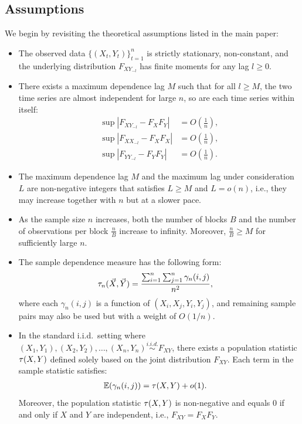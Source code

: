 \subsection{Assumptions}
We begin by revisiting the theoretical assumptions listed in the main paper:
\begin{itemize}
\item The observed data $\{(X_t, Y_t)\}_{t=1}^{n}$ is strictly stationary, non-constant, and the underlying distribution $F_{XY_{-l}}$ has finite moments for any lag $l \geq 0$. 
\item There exists a maximum dependence lag $M$ such that for all $l \geq M$, the two time series are almost independent for large $n$, so are each time series within itself:
    \begin{align*}
        \sup|F_{X Y_{-l}} - F_{X}F_{Y}| &= O(\frac{1}{n}) ,\\
        \sup|F_{X X_{-l}} - F_{X}F_{X}| &= O(\frac{1}{n}) ,\\
        \sup|F_{Y Y_{-l}} - F_{Y}F_{Y}| &= O(\frac{1}{n}) .
    \end{align*}
\item The maximum dependence lag $M$ and the maximum lag under consideration $L$ are non-negative integers that satisfies $L \geq M$ and $L=o(n)$, i.e., they may increase together with $n$ but at a slower pace.
\item As the sample size $n$ increases, both the number of blocks $B$ and the number of observations per block $\frac{n}{B}$ increase to infinity. Moreover, $\frac{n}{B} \geq M$ for sufficiently large $n$.
\item The sample dependence measure has the following form:
\begin{align*}
        \tau_{n}(\vec{X},\vec{Y}) &=\frac{\sum_{i=1}^{n}\sum_{j=1}^{n} \gamma_{n}(i,j)}{n^2},
    \end{align*} 
    where each $\gamma_{n}(i,j)$ is a function of $(X_i,X_j, Y_i,Y_j)$, and remaining sample pairs may also be used but with a weight of $O(1/n)$.
\item In the standard i.i.d.~setting where $(X_1,Y_1), (X_2, Y_2),\ldots, (X_n, Y_n) \stackrel{i.i.d.}{\sim} F_{XY}$, there exists a population statistic $\tau(X, Y)$ defined solely based on the joint distribution $F_{XY}$. Each term in the sample statistic satisfies:
\begin{align*}
        \mathbb{E}(\gamma_{n}(i,j)) &= \tau(X, Y) + o(1).
    \end{align*} 
    Moreover, the population statistic $\tau(X, Y)$ is non-negative and equals $0$ if and only if $X$ and $Y$ are independent, i.e., $F_{XY}=F_{X} F_{Y}$.
\end{itemize}

